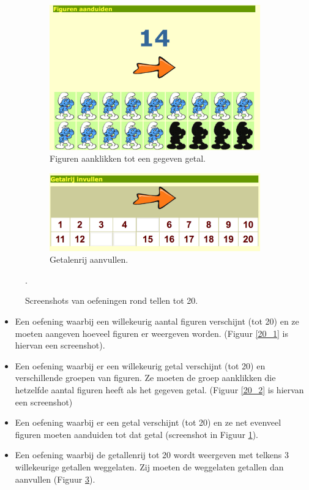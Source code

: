 \documentclass[a4paper,11pt]{article}
\theoremstyle{definition}
\begin{document}
\begin{itemize}
\begin{itemize}
\begin{figure}[h!]
          \begin{subfigure}{.5\textwidth}
          \centering
                \includegraphics[scale=0.15]{20_3.jpg}
                \caption{Figuren aanklikken tot een gegeven getal.}
                \label{20_3}
        \end{subfigure}%
        \begin{subfigure}{.5\textwidth}
           \centering
                \includegraphics[scale=0.15]{20_4.jpg}
                \caption{Getalenrij aanvullen.}
                \label{20_4}
        \end{subfigure}        \caption{Screenshots van oefeningen rond tellen tot 
        20.}.
\end{figure}

\begin{itemize}
  \item Een oefening waarbij een willekeurig aantal figuren verschijnt (tot 20) 
  en ze moeten aangeven hoeveel figuren er weergeven worden. (Figuur 
  \ref{20_1} is hiervan een screenshot).
  \item Een oefening waarbij er een willekeurig getal verschijnt (tot 20) en verschillende 
  groepen van figuren. Ze moeten de groep aanklikken die hetzelfde aantal 
  figuren heeft als het gegeven getal. (Figuur \ref{20_2} is hiervan een screenshot)
  \item Een oefening waarbij er een getal verschijnt (tot 20) en ze net evenveel figuren moeten aanduiden tot dat getal (screenshot in Figuur \ref{20_3}).
  \item Een oefening waarbij de getallenrij tot 20 wordt weergeven met telkens 3 
  willekeurige getallen weggelaten. Zij moeten de weggelaten getallen dan aanvullen (Figuur 
  \ref{20_4}).
\end{itemize}


\end{itemize}
\end{itemize}
\end{document}
